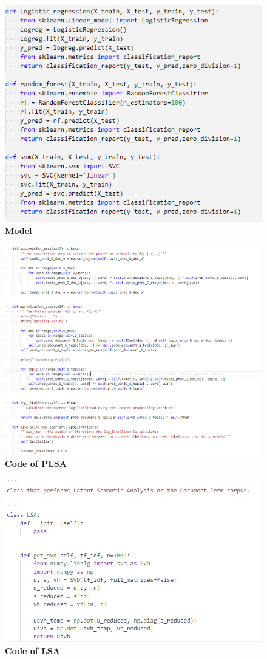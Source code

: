 \documentclass[12pt]{report}
\begin{document}
    \begin{figure}[h]
        \centering
        \includegraphics[scale=0.8]{model.png}
        \caption{\textbf{Model}}
    \end{figure}
    \begin{figure}[h]
        \centering
        \includegraphics[scale=0.4]{plsaCode.png}
        \caption{\textbf{Code of PLSA}}
    \end{figure}
    \begin{figure}[h]
        \centering
        \includegraphics{lsaCode.jpg}
        \caption{\textbf{Code of LSA}}
    \end{figure}
\end{document}
